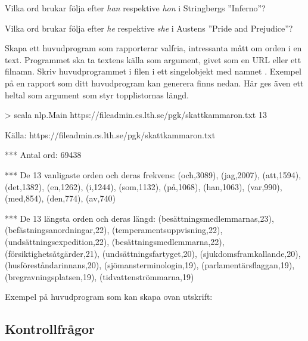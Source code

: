 \Subtask Vilka ord brukar följa efter \emph{han} respektive \emph{hon} i Stringbergs ''Inferno''?

\Subtask Vilka ord brukar följa efter \emph{he} respektive \emph{she} i Austens ''Pride and Prejudice''?


\Task Skapa ett huvudprogram som rapporterar valfria, intressanta mått om orden i en text. Programmet ska ta textens källa som argument, givet som en URL eller ett filnamn. Skriv huvudprogrammet i filen  i ett singelobjekt med namnet . Exempel på en rapport som ditt huvudprogram kan generera finns nedan. Här ges även ett heltal som argument som styr topplistornas längd.
\begin{REPL}
> scala nlp.Main https://fileadmin.cs.lth.se/pgk/skattkammaron.txt 13

Källa: https://fileadmin.cs.lth.se/pgk/skattkammaron.txt

*** Antal ord: 69438

*** De 13 vanligaste orden och deras frekvens:
(och,3089), (jag,2007), (att,1594), (det,1382), (en,1262),
(i,1244), (som,1132), (på,1068), (han,1063), (var,990),
(med,854), (den,774), (av,740)

*** De 13 längsta orden och deras längd:
(besättningsmedlemmarnas,23), (befästningsanordningar,22),
(temperamentsuppvisning,22), (undsättningsexpedition,22),
(besättningsmedlemmarna,22), (försiktighetsåtgärder,21),
(undsättningsfartyget,20), (sjukdomsframkallande,20),
(husföreståndarinnans,20), (sjömansterminologin,19),
(parlamentärsflaggan,19), (bregravningsplatsen,19),
(tidvattenströmmarna,19)
\end{REPL}

\noindent Exempel på huvudprogram som kan skapa ovan utskrift:

\subsection{Kontrollfrågor}\label{words-check}

